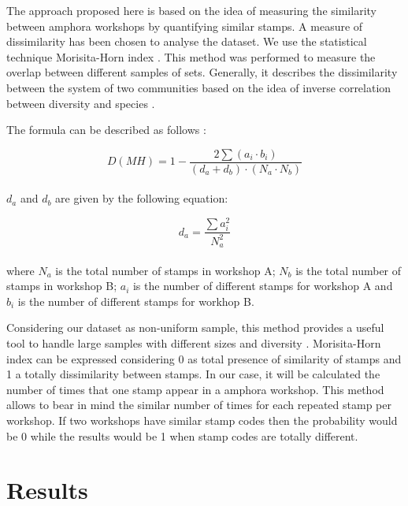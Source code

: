 \documentclass[review]{elsarticle}
\begin{document}
The approach proposed here is based on the idea of measuring the similarity between amphora workshops by quantifying similar stamps. A measure of dissimilarity has been chosen to analyse the dataset. We use the statistical technique Morisita-Horn index \citep{morisita_measuring_1959, horn_measurement_1966}. This method was performed to measure the overlap between different samples of sets. Generally, it describes the dissimilarity between the system of two communities based on the idea of inverse correlation between diversity and species \citep{magurran_why_1988}.

The formula can be described as follows \citep{magurran_measuring_2013}:

\begin{equation}
D(MH) = 1- \frac{2 \sum(a_{i} \cdot b_{i})}{(d_{a} + d_{b}) \cdot (N_{a} \cdot N_{b})}
\end{equation} \\

$d_{a}$ and $d_{b}$ are given by the following equation:

\begin{equation}
d_{a} = \frac{\sum a_{i}^{2}}{N_{a}^{2}} 
\end{equation} \\

where $N_{a}$ is the total number of stamps in workshop A; $N_{b}$ is the total number of stamps in workshop B; $a_{i}$ is the number of different stamps for workshop A and $b_{i}$ is the number of different stamps for workhop B.

Considering our dataset as non-uniform sample, this method provides a useful tool to handle large samples with different sizes and diversity \citep{wolda_similarity_1981}. Morisita-Horn index can be expressed considering 0 as total presence of similarity of stamps and 1 a totally dissimilarity between stamps. In our case, it will be calculated the number of times that one stamp appear in a amphora workshop. This method allows to bear in mind the similar number of times for each repeated stamp per workshop. If two workshops have similar stamp codes then the probability would be 0 while the results would be 1 when stamp codes are totally different. 


\section{Results}
\end{document}
